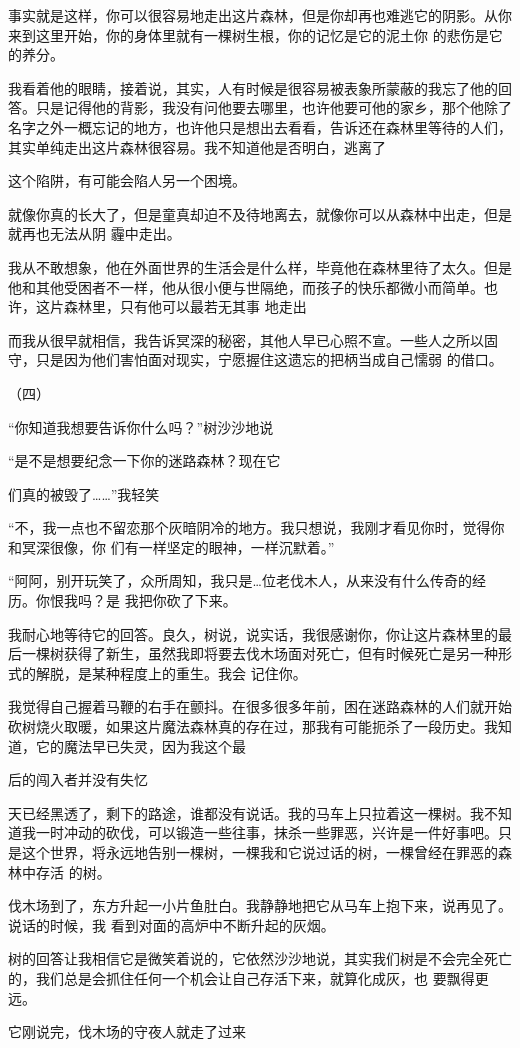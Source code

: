 \documentclass{article}
\begin{document}
事实就是这样，你可以很容易地走出这片森林，但是你却再也难逃它的阴影。从你来到这里开始，你的身体里就有一棵树生根，你的记忆是它的泥土你
的悲伤是它的养分。 

我看着他的眼睛，接着说，其实，人有时候是很容易被表象所蒙蔽的我忘了他的回答。只是记得他的背影，我没有问他要去哪里，也许他要可他的家乡，那个他除了名字之外一概忘记的地方，也许他只是想出去看看，告诉还在森林里等待的人们，其实单纯走出这片森林很容易。我不知道他是否明白，逃离了

\newpage
这个陷阱，有可能会陷人另一个困境。 

就像你真的长大了，但是童真却迫不及待地离去，就像你可以从森林中出走，但是就再也无法从阴
霾中走出。 

我从不敢想象，他在外面世界的生活会是什么样，毕竟他在森林里待了太久。但是他和其他受困者不一样，他从很小便与世隔绝，而孩子的快乐都微小而简单。也许，这片森林里，只有他可以最若无其事
地走出 

而我从很早就相信，我告诉冥深的秘密，其他人早已心照不宣。一些人之所以固守，只是因为他们害怕面对现实，宁愿握住这遗忘的把柄当成自己懦弱
的借口。 


（四） 

“你知道我想要告诉你什么吗？”树沙沙地说

“是不是想要纪念一下你的迷路森林？现在它
\newpage

们真的被毁了……”我轻笑 

“不，我一点也不留恋那个灰暗阴冷的地方。我只想说，我刚才看见你时，觉得你和冥深很像，你
们有一样坚定的眼神，一样沉默着。” 

“阿阿，别开玩笑了，众所周知，我只是…位老伐木人，从来没有什么传奇的经历。你恨我吗？是
我把你砍了下来。 

我耐心地等待它的回答。良久，树说，说实话，我很感谢你，你让这片森林里的最后一棵树获得了新生，虽然我即将要去伐木场面对死亡，但有时候死亡是另一种形式的解脱，是某种程度上的重生。我会
记住你。 

我觉得自己握着马鞭的右手在颤抖。在很多很多年前，困在迷路森林的人们就开始砍树烧火取暖，如果这片魔法森林真的存在过，那我有可能扼杀了一段历史。我知道，它的魔法早已失灵，因为我这个最

\newpage
后的闯入者并没有失忆 

天已经黑透了，剩下的路途，谁都没有说话。我的马车上只拉着这一棵树。我不知道我一时冲动的砍伐，可以锻造一些往事，抹杀一些罪恶，兴许是一件好事吧。只是这个世界，将永远地告别一棵树，一棵我和它说过话的树，一棵曾经在罪恶的森林中存活
的树。 

伐木场到了，东方升起一小片鱼肚白。我静静地把它从马车上抱下来，说再见了。说话的时候，我
看到对面的高炉中不断升起的灰烟。 

树的回答让我相信它是微笑着说的，它依然沙沙地说，其实我们树是不会完全死亡的，我们总是会抓住任何一个机会让自己存活下来，就算化成灰，也
要飘得更远。 

它刚说完，伐木场的守夜人就走了过来
\end{document}
